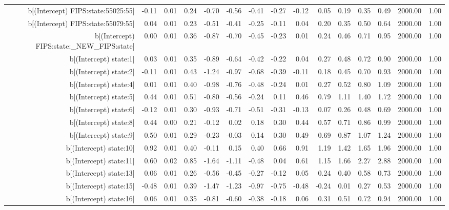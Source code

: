 \begin{table}[ht]
\begin{tabular}{rrrrrrrrrrrrrrr}
  b[(Intercept) FIPS:state:55025:55] & -0.11 & 0.01 & 0.24 & -0.70 & -0.56 & -0.41 & -0.27 & -0.12 & 0.05 & 0.19 & 0.35 & 0.49 & 2000.00 & 1.00 \\ 
  b[(Intercept) FIPS:state:55079:55] & 0.04 & 0.01 & 0.23 & -0.51 & -0.41 & -0.25 & -0.11 & 0.04 & 0.20 & 0.35 & 0.50 & 0.64 & 2000.00 & 1.00 \\ 
  b[(Intercept) FIPS:state:\_NEW\_FIPS:state] & 0.00 & 0.01 & 0.36 & -0.87 & -0.70 & -0.45 & -0.23 & 0.01 & 0.24 & 0.46 & 0.71 & 0.95 & 2000.00 & 1.00 \\ 
  b[(Intercept) state:1] & 0.03 & 0.01 & 0.35 & -0.89 & -0.64 & -0.42 & -0.22 & 0.04 & 0.27 & 0.48 & 0.72 & 0.90 & 2000.00 & 1.00 \\ 
  b[(Intercept) state:2] & -0.11 & 0.01 & 0.43 & -1.24 & -0.97 & -0.68 & -0.39 & -0.11 & 0.18 & 0.45 & 0.70 & 0.93 & 2000.00 & 1.00 \\ 
  b[(Intercept) state:4] & 0.01 & 0.01 & 0.40 & -0.98 & -0.76 & -0.48 & -0.24 & 0.01 & 0.27 & 0.52 & 0.80 & 1.09 & 2000.00 & 1.00 \\ 
  b[(Intercept) state:5] & 0.44 & 0.01 & 0.51 & -0.80 & -0.56 & -0.24 & 0.11 & 0.46 & 0.79 & 1.11 & 1.40 & 1.72 & 2000.00 & 1.00 \\ 
  b[(Intercept) state:6] & -0.12 & 0.01 & 0.30 & -0.93 & -0.71 & -0.51 & -0.31 & -0.13 & 0.07 & 0.26 & 0.48 & 0.69 & 2000.00 & 1.00 \\ 
  b[(Intercept) state:8] & 0.44 & 0.00 & 0.21 & -0.12 & 0.02 & 0.18 & 0.30 & 0.44 & 0.57 & 0.71 & 0.86 & 0.99 & 2000.00 & 1.00 \\ 
  b[(Intercept) state:9] & 0.50 & 0.01 & 0.29 & -0.23 & -0.03 & 0.14 & 0.30 & 0.49 & 0.69 & 0.87 & 1.07 & 1.24 & 2000.00 & 1.00 \\ 
  b[(Intercept) state:10] & 0.92 & 0.01 & 0.40 & -0.11 & 0.15 & 0.40 & 0.66 & 0.91 & 1.19 & 1.42 & 1.65 & 1.96 & 2000.00 & 1.00 \\ 
  b[(Intercept) state:11] & 0.60 & 0.02 & 0.85 & -1.64 & -1.11 & -0.48 & 0.04 & 0.61 & 1.15 & 1.66 & 2.27 & 2.88 & 2000.00 & 1.00 \\ 
  b[(Intercept) state:13] & 0.06 & 0.01 & 0.26 & -0.56 & -0.45 & -0.27 & -0.12 & 0.05 & 0.24 & 0.40 & 0.58 & 0.73 & 2000.00 & 1.00 \\ 
  b[(Intercept) state:15] & -0.48 & 0.01 & 0.39 & -1.47 & -1.23 & -0.97 & -0.75 & -0.48 & -0.24 & 0.01 & 0.27 & 0.53 & 2000.00 & 1.00 \\ 
  b[(Intercept) state:16] & 0.06 & 0.01 & 0.35 & -0.81 & -0.60 & -0.38 & -0.18 & 0.06 & 0.31 & 0.51 & 0.72 & 0.94 & 2000.00 & 1.00 \\ 

\end{tabular}
\end{table}
